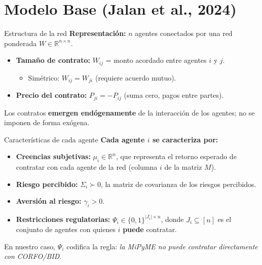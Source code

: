 \documentclass[aspectratio=169]{beamer}
\begin{document}
\section{Modelo Base (Jalan et al., 2024)}

\begin{frame}{Estructura de la red}
\textbf{Representación:} $n$ agentes conectados por una red ponderada $W \in \mathbb{R}^{n\times n}$.

\vspace{0.3cm}
\begin{itemize}
    \item \textbf{Tamaño de contrato:} $W_{ij}$ = monto acordado entre agentes $i$ y $j$.
    \begin{itemize}
        \item Simétrico: $W_{ij}=W_{ji}$ (requiere acuerdo mutuo).
    \end{itemize}
    \item \textbf{Precio del contrato:} $P_{ji}=-P_{ij}$ (suma cero, pagos entre partes).
\end{itemize}

\vspace{0.3cm}
Los contratos \textbf{emergen endógenamente} de la interacción de los agentes; no se imponen de forma exógena.
\end{frame}

\begin{frame}{Características de cada agente}
\textbf{Cada agente $i$ se caracteriza por:}
\begin{itemize}
    \item \textbf{Creencias subjetivas:} $\mu_i \in \mathbb{R}^n$, que representa el retorno esperado de contratar con cada agente de la red (columna $i$ de la matriz $M$).
    \item \textbf{Riesgo percibido:} $\Sigma_i \succ 0$, la matriz de covarianza de los riesgos percibidos.
    \item \textbf{Aversión al riesgo:} $\gamma_i > 0$.
    \item \textbf{Restricciones regulatorias:} $\Psi_i \in \{0,1\}^{|J_i|\times n}$, donde $J_i \subseteq [n]$ es el conjunto de agentes con quienes $i$ \textbf{puede} contratar.
\end{itemize}

\vspace{0.3cm}
\footnotesize{En nuestro caso, $\Psi_i$ codifica la regla: \emph{la MiPyME no puede contratar directamente con CORFO/BID}.}
\end{frame}
\end{document}
